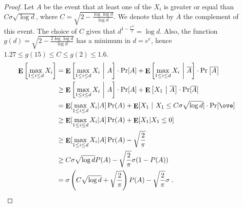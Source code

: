 \documentclass{article}
\DeclareMathOperator*{\Exp}{\mathbf{E}}
\begin{document}
\begin{proof}

Let $A$ be the event that at least one of the $X_i$ is greater or equal than $C
\sigma \sqrt{\log d}$, where $C=\sqrt{2-\frac{\log \log d}{\log d}}$. We denote that by $\overline{A}$
the complement of this event. The choice of $C$ gives that $d^{1-\frac{C^2}{2}}=\log d$.
Also, the function $g(d)=\sqrt{2-\frac{2\log \log d}{\log d}}$ has a minimum in $d=e^e$, hence
$1.27 \leq g(15) \leq C\leq g(2)\leq 1.6$.
%
\begin{align*}
\Exp \left[ \max_{1 \le i \le d} X_i \right]
&= \Exp \left[ \max_{1 \le i \le d} X_i ~\bigg|~ A \right] \cdot \Pr[A] + \Exp \left[ \max_{1 \le i \le d} X_i ~\bigg|~ \overline{A} \right] \cdot \Pr \left[ \overline{A} \right] \\
&\ge \Exp \left[ \max_{1 \le i \le d} X_i ~\bigg|~ A \right] \cdot \Pr[A] + \Exp \left[ X_1 ~\big|~ \overline{A} \right] \cdot \Pr[\overline{A}] \\
&= \Exp[\max_{1 \le i \le d} X_i| A ] \Pr(A) + \Exp[X_1~|~ X_1 \le C \sigma \sqrt{\log d}] \cdot \Pr[\ove] \\
&\ge \Exp[\max_{1 \le i \le d} X_i| A ] \Pr(A) + \Exp[X_1| X_1 \le 0] \\
&\ge \Exp[\max_{1 \le i \le d} X_i| A ] \Pr(A) - \sqrt{\frac{2}{\pi}} \\
&\ge C \sigma \sqrt{\log d} P(A) - \sqrt{\frac{2}{\pi}} \sigma (1-P(A))\\
&= \sigma \left(C\sqrt{\log d} +\sqrt{\frac{2}{\pi}}\right)P(A) -  \sqrt{\frac{2}{\pi}} \sigma \; .
\end{align*}


\end{proof}
\end{document}
